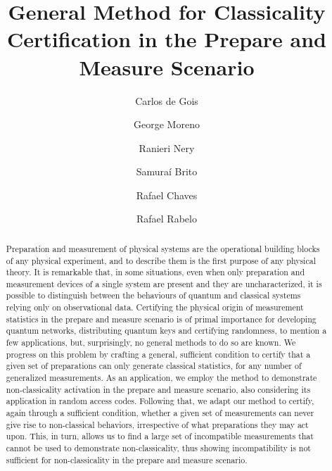 \documentclass[a4paper,preprintnumbers,floatfix,superscriptaddress,pra,twocolumn,showpacs,notitlepage,longbibliography]{revtex4-2}
\begin{document}
\title{General Method for Classicality Certification in the Prepare and Measure Scenario}

\author{Carlos de Gois}
\author{George Moreno}
\author{Ranieri Nery}
\author{Samuraí Brito}
\author{Rafael Chaves}
\author{Rafael Rabelo}


\begin{abstract}
   Preparation and measurement of physical systems are the operational building blocks of any physical experiment, and to describe them is the first purpose of any physical theory. It is remarkable that, in some situations, even when only preparation and measurement devices of a single system are present and they are uncharacterized, it is possible to distinguish between the behaviours of quantum and classical systems relying only on observational data. Certifying the physical origin of measurement statistics in the prepare and measure scenario is of primal importance for developing quantum networks, distributing quantum keys and certifying randomness, to mention a few applications, but, surprisingly, no general methods to do so are known. We progress on this problem by crafting a general, sufficient condition to certify that a given set of preparations can only generate classical statistics, for any number of generalized measurements. As an application, we employ the method to demonstrate non-classicality activation in the prepare and measure scenario, also considering its application in random access codes. Following that, we adapt our method to certify, again through a sufficient condition, whether a given set of measurements can never give rise to non-classical behaviors, irrespective of what preparations they may act upon. This, in turn, allows us to find a large set of incompatible measurements that cannot be used to demonstrate non-classicality, thus showing incompatibility is not sufficient for non-classicality in the prepare and measure scenario.
\end{abstract}
\end{document}

